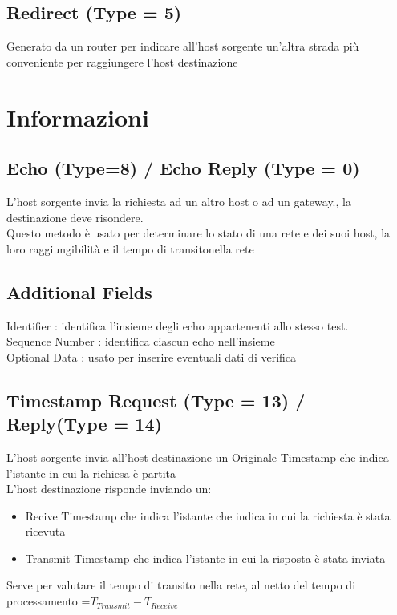 \documentclass{report}
\begin{document}
            \subsection{Redirect (Type = 5)}
                Generato da un router per indicare all'host sorgente un'altra strada più conveniente per raggiungere l'host destinazione
                
        \section{Informazioni}
            \subsection{Echo (Type=8) / Echo Reply (Type = 0)}
                L'host sorgente invia la richiesta ad un altro host o ad un gateway., la destinazione deve risondere.
                \\
                Questo metodo è usato per determinare lo stato di una rete e dei suoi host, la loro raggiungibilità e il tempo di transitonella rete
            \subsection{Additional Fields}
                Identifier : identifica l'insieme degli echo appartenenti allo stesso test.
                \\
                Sequence Number : identifica ciascun echo nell'insieme 
                \\
                Optional Data : usato per inserire eventuali dati di verifica
            \subsection{Timestamp Request (Type = 13) / Reply(Type = 14)}
                L'host sorgente invia all'host destinazione un Originale Timestamp che indica l'istante in cui la richiesa è partita
                \\
                L'host destinazione risponde inviando un:
                \begin{itemize}
                    \item Recive Timestamp che indica l'istante che indica in cui la richiesta è stata ricevuta
                    \item Transmit Timestamp che indica l'istante in cui la risposta è stata inviata
                \end{itemize}
                Serve per valutare il tempo di transito nella rete, al netto del tempo di processamento =$T_{Transmit}-T_{Receive}$
\end{document}
